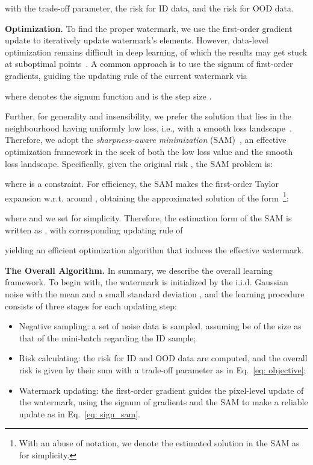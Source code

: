 \documentclass{article}
\begin{document}
with  the trade-off parameter,  the risk for ID data, and  the risk for OOD data. 

                        

{\textbf{Optimization.} To find the proper watermark, we use the first-order gradient update to iteratively update watermark's elements. However, data-level optimization remains difficult in deep learning, of which the results may get stuck at suboptimal points~\cite{wang2021probabilistic}. A common approach is to use the signum of first-order gradients, guiding the updating rule of the current watermark via

where  denotes the signum function and  is the step size \cite{madry2017towards}. }

Further, for generality and insensibility, we prefer the solution that lies in the neighbourhood having uniformly low loss, i.e., with a smooth loss landscape~\cite{KeskarMNST17}. Therefore, we adopt the \emph{sharpness-aware minimization} (SAM)~\cite{ForetKMN21}, an effective optimization framework in the seek of both the low loss value and the smooth loss landscape. Specifically, given the original risk , the SAM problem is:

where  is a constraint. For efficiency, the SAM makes the first-order Taylor expansion w.r.t.  around , obtaining the approximated solution of the form~\footnote{With an abuse of notation, we denote the estimated solution in the SAM as  for simplicity.}:

where  and we set  for simplicity. Therefore, the estimation form of the SAM is written as , with corresponding updating rule of

yielding an efficient optimization algorithm that induces the effective watermark. 








\textbf{The Overall Algorithm.} In summary, we describe the overall learning framework. To begin with, the watermark is initialized by the i.i.d. Gaussian noise with the  mean and a small standard deviation , and the learning procedure consists of three stages for each updating step:
\begin{itemize}
    \item Negative sampling: a set of noise data  is sampled, assuming be of the size  as that of the mini-batch regarding the ID sample;
\item Risk calculating: the risk for ID and OOD data are computed, and the overall risk is given by their sum with a trade-off parameter  as in Eq.~\eqref{eq: objective};
\item Watermark updating: the first-order gradient guides the pixel-level update of the watermark, using the signum of gradients and the SAM to make a reliable update as in Eq.~\eqref{eq: sign_sam}. 
\end{itemize}
\end{document}
